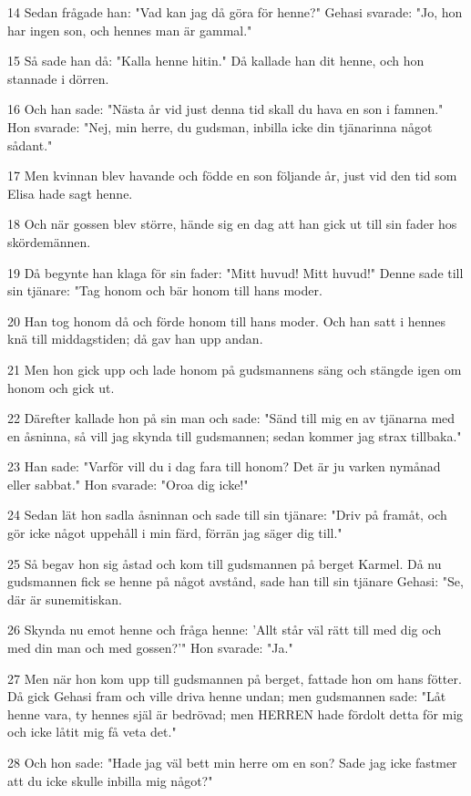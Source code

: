 \par 14 Sedan frågade han: "Vad kan jag då göra för henne?" Gehasi svarade: "Jo, hon har ingen son, och hennes man är gammal."
\par 15 Så sade han då: "Kalla henne hitin." Då kallade han dit henne, och hon stannade i dörren.
\par 16 Och han sade: "Nästa år vid just denna tid skall du hava en son i famnen." Hon svarade: "Nej, min herre, du gudsman, inbilla icke din tjänarinna något sådant."
\par 17 Men kvinnan blev havande och födde en son följande år, just vid den tid som Elisa hade sagt henne.
\par 18 Och när gossen blev större, hände sig en dag att han gick ut till sin fader hos skördemännen.
\par 19 Då begynte han klaga för sin fader: "Mitt huvud! Mitt huvud!" Denne sade till sin tjänare: "Tag honom och bär honom till hans moder.
\par 20 Han tog honom då och förde honom till hans moder. Och han satt i hennes knä till middagstiden; då gav han upp andan.
\par 21 Men hon gick upp och lade honom på gudsmannens säng och stängde igen om honom och gick ut.
\par 22 Därefter kallade hon på sin man och sade: "Sänd till mig en av tjänarna med en åsninna, så vill jag skynda till gudsmannen; sedan kommer jag strax tillbaka."
\par 23 Han sade: "Varför vill du i dag fara till honom? Det är ju varken nymånad eller sabbat." Hon svarade: "Oroa dig icke!"
\par 24 Sedan lät hon sadla åsninnan och sade till sin tjänare: "Driv på framåt, och gör icke något uppehåll i min färd, förrän jag säger dig till."
\par 25 Så begav hon sig åstad och kom till gudsmannen på berget Karmel. Då nu gudsmannen fick se henne på något avstånd, sade han till sin tjänare Gehasi: "Se, där är sunemitiskan.
\par 26 Skynda nu emot henne och fråga henne: 'Allt står väl rätt till med dig och med din man och med gossen?'" Hon svarade: "Ja."
\par 27 Men när hon kom upp till gudsmannen på berget, fattade hon om hans fötter. Då gick Gehasi fram och ville driva henne undan; men gudsmannen sade: "Låt henne vara, ty hennes själ är bedrövad; men HERREN hade fördolt detta för mig och icke låtit mig få veta det."
\par 28 Och hon sade: "Hade jag väl bett min herre om en son? Sade jag icke fastmer att du icke skulle inbilla mig något?"
